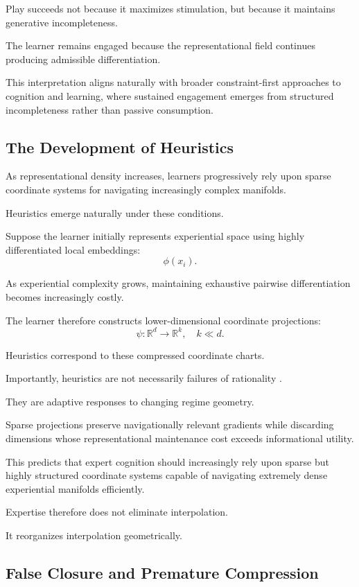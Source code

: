 \documentclass[12pt,a4paper]{article}
\begin{document}
Play succeeds not because it maximizes stimulation, but because it maintains generative incompleteness.

The learner remains engaged because the representational field continues producing admissible differentiation.

This interpretation aligns naturally with broader constraint-first approaches to cognition and learning, where sustained engagement emerges from structured incompleteness rather than passive consumption.

\subsection{The Development of Heuristics}

As representational density increases, learners progressively rely upon sparse coordinate systems for navigating increasingly complex manifolds.

Heuristics emerge naturally under these conditions.

Suppose the learner initially represents experiential space using highly differentiated local embeddings:
\[
\phi(x_i).
\]

As experiential complexity grows, maintaining exhaustive pairwise differentiation becomes increasingly costly.

The learner therefore constructs lower-dimensional coordinate projections:
\[
\psi:
\mathbb{R}^d
\rightarrow
\mathbb{R}^k,
\quad
k \ll d.
\]

Heuristics correspond to these compressed coordinate charts.

Importantly, heuristics are not necessarily failures of rationality \cite{Gigerenzer2009}.

They are adaptive responses to changing regime geometry.

Sparse projections preserve navigationally relevant gradients while discarding dimensions whose representational maintenance cost exceeds informational utility.

This predicts that expert cognition should increasingly rely upon sparse but highly structured coordinate systems capable of navigating extremely dense experiential manifolds efficiently.

Expertise therefore does not eliminate interpolation.

It reorganizes interpolation geometrically.

\subsection{False Closure and Premature Compression}
\end{document}
